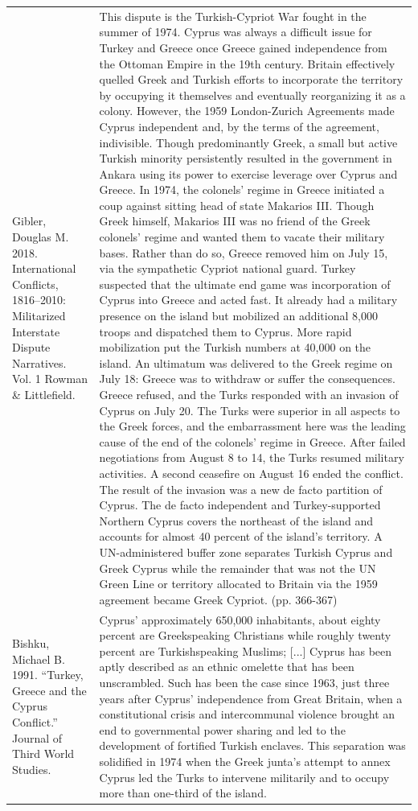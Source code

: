 {\begin{longtable}{p{}p{}}
Gibler, Douglas M. 2018. International Conflicts, 1816–2010: Militarized Interstate Dispute Narratives. Vol. 1 Rowman \& Littlefield. & This dispute is the Turkish-Cypriot War fought in the summer of 1974. Cyprus was always a difficult issue for Turkey and Greece once Greece gained independence from the Ottoman Empire in the 19th century. Britain effectively quelled Greek and Turkish efforts to incorporate the territory by occupying it themselves and eventually reorganizing it as a colony. However, the 1959 London-Zurich Agreements made Cyprus independent and, by the terms of the agreement, indivisible. Though predominantly Greek, a small but active Turkish minority persistently resulted in the government in Ankara using its power to exercise leverage over Cyprus and Greece. In 1974, the colonels' regime in Greece initiated a coup against sitting head of state Makarios III. Though Greek himself, Makarios III was no friend of the Greek colonels' regime and wanted them to vacate their military bases. Rather than do so, Greece removed him on July 15, via the sympathetic Cypriot national guard. Turkey suspected that the ultimate end game was incorporation of Cyprus into Greece and acted fast. It already had a military presence on the island but mobilized an additional 8,000 troops and dispatched them to Cyprus. More rapid mobilization put the Turkish numbers at 40,000 on the island. An ultimatum was delivered to the Greek regime on July 18: Greece was to withdraw or suffer the consequences. Greece refused, and the Turks responded with an invasion of Cyprus on July 20. The Turks were superior in all aspects to the Greek forces, and the embarrassment here was the leading cause of the end of the colonels' regime in Greece. After failed negotiations from August 8 to 14, the Turks resumed military activities. A second ceasefire on August 16 ended the conflict. The result of the invasion was a new de facto partition of Cyprus. The de facto independent and Turkey-supported Northern Cyprus covers the northeast of the island and accounts for almost 40 percent of the island's territory. A UN-administered buffer zone separates Turkish Cyprus and Greek Cyprus while the remainder that was not the UN Green Line or territory allocated to Britain via the 1959 agreement became Greek Cypriot. (pp. 366-367)
\\
Bishku, Michael B. 1991. “Turkey, Greece and the Cyprus Conflict.” Journal of Third World Studies. & Cyprus' approximately 650,000 inhabitants, about eighty percent are Greekspeaking Christians while roughly twenty percent are Turkishspeaking Muslims; [...] Cyprus has been aptly described as an ethnic omelette that has been unscrambled. Such has been the case since 1963, just three years after Cyprus' independence from Great Britain, when a constitutional crisis and intercommunal violence brought an end to governmental power sharing and led to the development of fortified Turkish enclaves. This separation was solidified in 1974 when the Greek junta's attempt to annex Cyprus led the Turks to intervene militarily and to occupy more than one-third of the island.

\end{longtable}}
